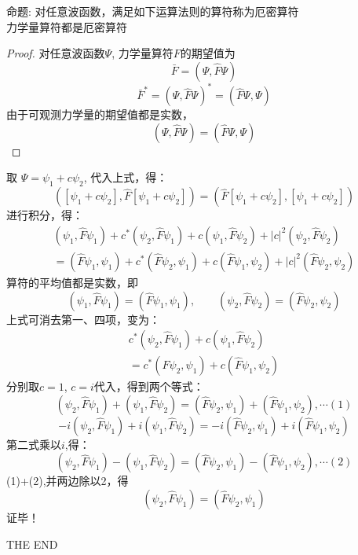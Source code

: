 \begin{frame} [allowframebreaks=]
    \begin{tcolorbox1}{命题:}
        对任意波函数，满足如下运算法则的算符称为厄密算符\\
            力学量算符都是厄密算符  
        \end{tcolorbox1}
    \begin{proof}
        对任意波函数$\Psi$, 力学量算符$F$的期望值为\\
        $$\bar{F}=(\Psi,\hat{F} \Psi) $$
        $$\bar{F}^*=(\Psi, \hat{F} \Psi)^* = (\hat{F}\Psi, \Psi) $$
        由于可观测力学量的期望值都是实数，\\
        $$(\Psi,\hat{F}\Psi)=(\hat{F} \Psi, \Psi) $$
    \end{proof}
\end{frame} 

\begin{frame} [allowframebreaks=]
        取 $\Psi= \psi_1+c\psi_2 $, 代入上式，得：
        $$([\psi_1+c\psi_2],\hat{F} [\psi_1+c\psi_2])=(\hat{F}[\psi_1+c\psi_2],[\psi_1+c\psi_2]) $$
        进行积分，得：
        $$
        \begin{array}{r}
        \left(\psi_{1}, \hat{F} \psi_{1}\right)+c^{*}\left(\psi_{2}, \hat{F} \psi_{1}\right)+c\left(\psi_{1}, \hat{F} \psi_{2}\right)+|c|^{2}\left(\psi_{2}, \hat{F} \psi_{2}\right) \\
        =\left(\hat{F} \psi_{1}, \psi_{1}\right)+c^{*}\left(\hat{F} \psi_{2}, \psi_{1}\right)+c\left(\hat{F} \psi_{1}, \psi_{2}\right)+|c|^{2}\left(\hat{F} \psi_{2}, \psi_{2}\right)
        \end{array}
        $$
        算符的平均值都是实数，即 
        $$(\psi_1,\hat{F}\psi_1)=(\hat{F} \psi_1, \psi_1), \qquad (\psi_2,\hat{F}\psi_2)=(\hat{F} \psi_2, \psi_2) $$
        上式可消去第一、四项，变为：
        $$\begin{array}{r}
            c^{*}\left(\psi_{2}, \hat{F} \psi_{1}\right)+c\left(\psi_{1}, \hat{F} \psi_{2}\right) \\
            =c^{*}\left(\hat{F} \psi_{2}, \psi_{1}\right)+c\left(\hat{F} \psi_{1}, \psi_{2}\right)
        \end{array}$$
        分别取$c=1$, $c=i$代入，得到两个等式：
        $$  \left(\psi_{2}, \hat{F} \psi_{1}\right)+\left(\psi_{1}, \hat{F} \psi_{2}\right) = 
        \left(\hat{F} \psi_{2}, \psi_{1}\right)+\left(\hat{F} \psi_{1}, \psi_{2}\right) , \cdots (1)
        $$
        $$
        -i\left(\psi_{2}, \hat{F} \psi_{1}\right)+i\left(\psi_{1}, \hat{F} \psi_{2}\right) 
        =-i\left(\hat{F} \psi_{2}, \psi_{1}\right)+i\left(\hat{F} \psi_{1}, \psi_{2}\right)
        $$
        第二式乘以$i$,得：
        $$
        \left(\psi_{2}, \hat{F} \psi_{1}\right)-\left(\psi_{1}, \hat{F} \psi_{2}\right) 
        =\left(\hat{F} \psi_{2}, \psi_{1}\right)-\left(\hat{F} \psi_{1}, \psi_{2}\right), \cdots (2)
        $$
        (1)+(2),并两边除以2，得
        $$
        \left(\psi_{2}, \hat{F} \psi_{1}\right) =\left(\hat{F} \psi_{2}, \psi_{1}\right)
        $$
        证毕！
\end{frame} 

\begin{frame} [allowframebreaks=]
    THE END
\end{frame} 